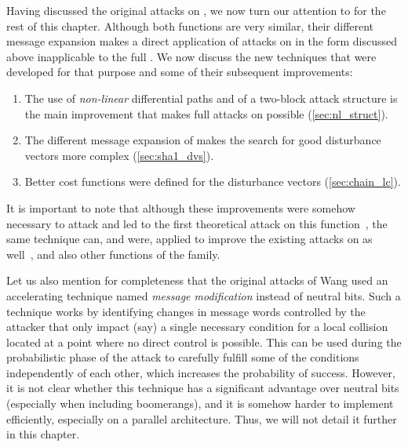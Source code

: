 Having discussed the original attacks on \shazero, we now turn our attention to \shaone for the rest of this chapter. Although both functions are very similar, their different message expansion makes a direct
application of attacks on \shazero in the form discussed above inapplicable to the full \shaone. We now discuss the new techniques that were developed for that purpose and some of their
subsequent improvements:
\begin{enumerate}
\item The use of \emph{non-linear} differential paths and of a two-block attack structure is the main improvement that makes full attacks on \shaone possible (\autoref{sec:nl_struct}).
\item The different message expansion of \shaone makes the search for good disturbance vectors more complex (\autoref{sec:sha1_dvs}).
\item Better cost functions were defined for the disturbance vectors (\autoref{sec:chain_lc}).
\end{enumerate}
It is important to note that although these improvements were somehow necessary to attack \shaone and led to the first theoretical attack on this function~\cite{DBLP:conf/crypto/WangYY05a},
the same technique can, and were, applied to improve the existing attacks on \shazero as well~\cite{DBLP:conf/crypto/WangYY05}, and also other functions of the \mdsha family.

Let us also mention for completeness that the original attacks of Wang \etal used an accelerating technique named \emph{message modification} instead of neutral bits. Such a technique works
by identifying changes in message words controlled by the attacker that only impact (say) a single necessary condition for a local collision located at a point where no direct control is possible.
This can be used during the probabilistic phase of the attack to carefully fulfill some of the conditions independently of each other, which increases the probability of success. However, it is not
clear whether this technique has a significant advantage over neutral bits (especially when including boomerangs), and it is somehow harder to implement efficiently, especially on a parallel architecture. Thus, we will not detail it
further in this chapter.


